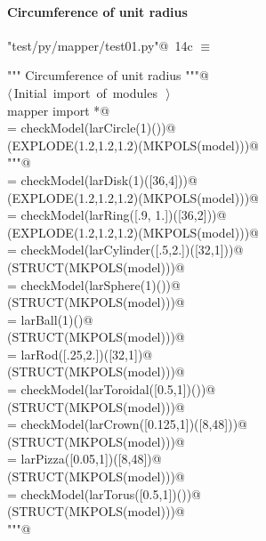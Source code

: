 \documentclass[11pt,oneside]{article}	%
\begin{document}
\paragraph{Circumference of unit radius}

\begin{flushleft} \small \label{scrap33}
\protect{}\verb@"test/py/mapper/test01.py"@\nobreak\ {\footnotesize 14c }$\equiv$
\vspace{-1ex}
\begin{list}{}{} \item
\mbox{}\verb@""" Circumference of unit radius """@\\
\mbox{}\verb@@\hbox{$\langle\,$Initial import of modules\nobreak\ {\footnotesize {}}$\,\rangle$}\verb@@\\
\mbox{}\verb@from mapper import *@\\
\mbox{}\verb@model = checkModel(larCircle(1)())@\\
\mbox{}\verb@VIEW(EXPLODE(1.2,1.2,1.2)(MKPOLS(model)))@\\
\mbox{}\verb@"""@\\
\mbox{}\verb@model = checkModel(larDisk(1)([36,4]))@\\
\mbox{}\verb@VIEW(EXPLODE(1.2,1.2,1.2)(MKPOLS(model)))@\\
\mbox{}\verb@model = checkModel(larRing([.9, 1.])([36,2]))@\\
\mbox{}\verb@VIEW(EXPLODE(1.2,1.2,1.2)(MKPOLS(model)))@\\
\mbox{}\verb@model = checkModel(larCylinder([.5,2.])([32,1]))@\\
\mbox{}\verb@VIEW(STRUCT(MKPOLS(model)))@\\
\mbox{}\verb@model = checkModel(larSphere(1)())@\\
\mbox{}\verb@VIEW(STRUCT(MKPOLS(model)))@\\
\mbox{}\verb@model = larBall(1)()@\\
\mbox{}\verb@VIEW(STRUCT(MKPOLS(model)))@\\
\mbox{}\verb@model = larRod([.25,2.])([32,1])@\\
\mbox{}\verb@VIEW(STRUCT(MKPOLS(model)))@\\
\mbox{}\verb@model = checkModel(larToroidal([0.5,1])())@\\
\mbox{}\verb@VIEW(STRUCT(MKPOLS(model)))@\\
\mbox{}\verb@model = checkModel(larCrown([0.125,1])([8,48]))@\\
\mbox{}\verb@VIEW(STRUCT(MKPOLS(model)))@\\
\mbox{}\verb@model = larPizza([0.05,1])([8,48])@\\
\mbox{}\verb@VIEW(STRUCT(MKPOLS(model)))@\\
\mbox{}\verb@model = checkModel(larTorus([0.5,1])())@\\
\mbox{}\verb@VIEW(STRUCT(MKPOLS(model)))@\\
\mbox{}\verb@"""@\\
\mbox{}\verb@@{\NWsep}
\end{list}
\vspace{-2ex}
\end{flushleft}
\end{document}
